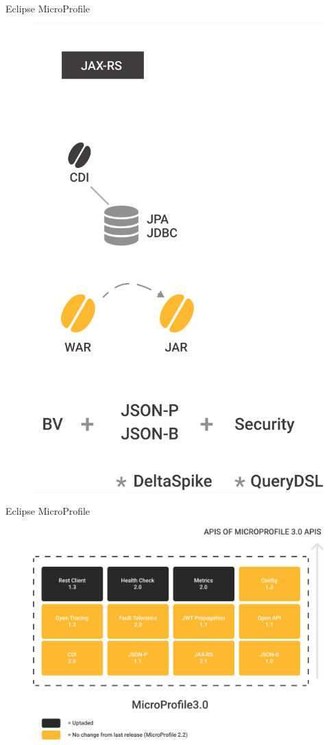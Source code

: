 \documentclass[aspectratio=169]{beamer}
\begin{document}
\begin{frame}{Eclipse MicroProfile}
\begin{figure}
	\centering
	\includegraphics[width=0.4\linewidth]{Images/newsetup}
\end{figure}
\end{frame}

\begin{frame}{Eclipse MicroProfile}
\begin{figure}
	\centering
	\includegraphics[width=0.9\linewidth]{Images/microprofileapis}
\end{figure}
\end{frame}

\end{document}
